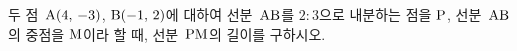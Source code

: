 두 점~$\mathrm{A}(4,\,-3)$, $\mathrm{B}(-1,\,2)$에 대하여 선분~$\mathrm{AB}$를 $2:3$으로 내분하는 점을 $\mathrm{P}$, 선분~$\mathrm{AB}$의 중점을 $\mathrm{M}$이라 할 때, 선분~$\mathrm{PM}$의 길이를 구하시오.
